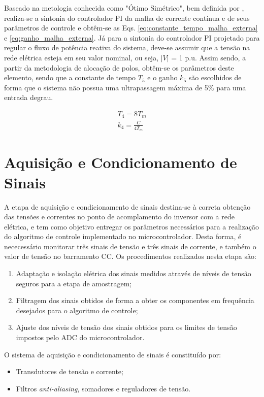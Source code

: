 Baseado na metologia conhecida como "Ótimo Simétrico", bem definida por \cite{ArticleRezek}, realiza-se a sintonia do controlador PI da malha de corrente contínua e de seus parâmetros de controle e obtêm-se as Eqs. \ref{eq:constante_tempo_malha_externa} e \ref{eq:ganho_malha_externa}. Já para a sintonia do controlador PI projetado para regular o fluxo de potência reativa do sistema, deve-se assumir que a tensão na rede elétrica esteja em seu valor nominal, ou seja, $|V|$ = 1 p.u. Assim sendo, a partir da metodologia de alocação de polos, obtêm-se os parâmetros deste elemento, sendo que a constante de tempo $T_5$ e o ganho $k_5$ são escolhidos de forma que o sistema não possua uma ultrapassagem máxima de 5\% para uma entrada degrau.

\begin{align}
	T_4 = 8T_m\label{eq:constante_tempo_malha_externa}\\
	k_4 = \frac{C}{4T_m}\label{eq:ganho_malha_externa}
\end{align}


\section{Aquisição e Condicionamento de Sinais}

A etapa de aquisição e condicionamento de sinais destina-se à correta obtenção das tensões e correntes no ponto de acomplamento do inversor com a rede elétrica, e tem como objetivo entregar os parâmetros necessários para a realização do algoritmo de controle implementado no microcontrolador.
Desta forma, é nececessário monitorar três sinais de tensão e três sinais de corrente, e também o valor de tensão no barramento CC.
Os procedimentos realizados nesta etapa são:
\begin{enumerate}
	\item Adaptação e isolação elétrica dos sinais medidos através de níveis de tensão seguros para a etapa de amostragem;
	\item Filtragem dos sinais obtidos de forma a obter os componentes em frequência desejados para o algoritmo de controle;
	\item Ajuste dos níveis de tensão dos sinais obtidos para os limites de tensão impostos pelo ADC do microcontrolador.
\end{enumerate}

O sistema de aquisição e condicionamento de sinais é constituído por:

\begin{itemize}
	\item Transdutores de tensão e corrente;
	\item Filtros \textit{anti-aliasing}, somadores e reguladores de tensão.
\end{itemize}


